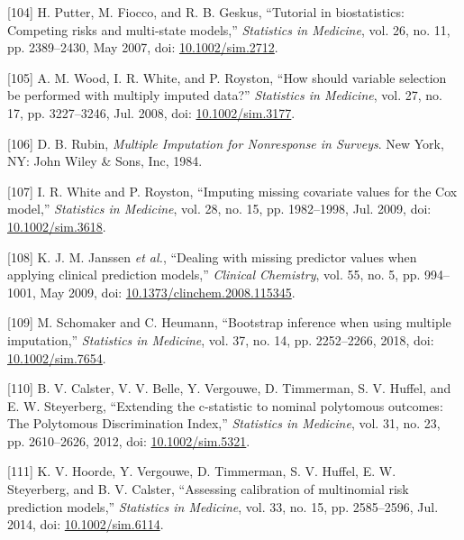 \documentclass[12pt,PhD,twoside,openright]{muthesis}
\newenvironment{cslreferences}%
  {}%
  {\par}
\begin{document}
\begin{cslreferences}
\leavevmode\hypertarget{ref-putter_tutorial_2007}{}%
{[}104{]} H. Putter, M. Fiocco, and R. B. Geskus, ``Tutorial in biostatistics: Competing risks and multi-state models,'' \emph{Statistics in Medicine}, vol. 26, no. 11, pp. 2389--2430, May 2007, doi: \href{https://doi.org/10.1002/sim.2712}{10.1002/sim.2712}.

\leavevmode\hypertarget{ref-wood_how_2008}{}%
{[}105{]} A. M. Wood, I. R. White, and P. Royston, ``How should variable selection be performed with multiply imputed data?'' \emph{Statistics in Medicine}, vol. 27, no. 17, pp. 3227--3246, Jul. 2008, doi: \href{https://doi.org/10.1002/sim.3177}{10.1002/sim.3177}.

\leavevmode\hypertarget{ref-rubin_multiple_1984}{}%
{[}106{]} D. B. Rubin, \emph{Multiple Imputation for Nonresponse in Surveys}. New York, NY: John Wiley \& Sons, Inc, 1984.

\leavevmode\hypertarget{ref-white_imputing_2009}{}%
{[}107{]} I. R. White and P. Royston, ``Imputing missing covariate values for the Cox model,'' \emph{Statistics in Medicine}, vol. 28, no. 15, pp. 1982--1998, Jul. 2009, doi: \href{https://doi.org/10.1002/sim.3618}{10.1002/sim.3618}.

\leavevmode\hypertarget{ref-janssen_dealing_2009}{}%
{[}108{]} K. J. M. Janssen \emph{et al.}, ``Dealing with missing predictor values when applying clinical prediction models,'' \emph{Clinical Chemistry}, vol. 55, no. 5, pp. 994--1001, May 2009, doi: \href{https://doi.org/10.1373/clinchem.2008.115345}{10.1373/clinchem.2008.115345}.

\leavevmode\hypertarget{ref-schomaker_bootstrap_2018}{}%
{[}109{]} M. Schomaker and C. Heumann, ``Bootstrap inference when using multiple imputation,'' \emph{Statistics in Medicine}, vol. 37, no. 14, pp. 2252--2266, 2018, doi: \href{https://doi.org/10.1002/sim.7654}{10.1002/sim.7654}.

\leavevmode\hypertarget{ref-calster_extending_2012-1}{}%
{[}110{]} B. V. Calster, V. V. Belle, Y. Vergouwe, D. Timmerman, S. V. Huffel, and E. W. Steyerberg, ``Extending the c-statistic to nominal polytomous outcomes: The Polytomous Discrimination Index,'' \emph{Statistics in Medicine}, vol. 31, no. 23, pp. 2610--2626, 2012, doi: \href{https://doi.org/10.1002/sim.5321}{10.1002/sim.5321}.

\leavevmode\hypertarget{ref-hoorde_assessing_2014}{}%
{[}111{]} K. V. Hoorde, Y. Vergouwe, D. Timmerman, S. V. Huffel, E. W. Steyerberg, and B. V. Calster, ``Assessing calibration of multinomial risk prediction models,'' \emph{Statistics in Medicine}, vol. 33, no. 15, pp. 2585--2596, Jul. 2014, doi: \href{https://doi.org/10.1002/sim.6114}{10.1002/sim.6114}.
\end{cslreferences}
\end{document}
